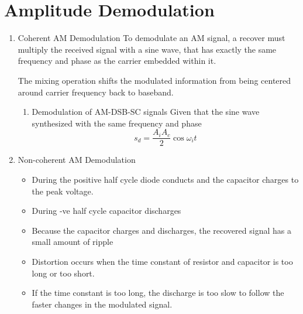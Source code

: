 \documentclass[11pt]{report}
\begin{document}
\section{Amplitude Demodulation}
\label{sec:org9c1f102}
\begin{enumerate}
\item Coherent AM Demodulation
\label{sec:org18ba5b4}
To demodulate an AM signal, a recover must multiply the received signal with a sine wave, that has exactly the same frequency and phase as the carrier embedded within it.

The mixing operation shifts the modulated information from being centered around carrier frequency back to baseband.
\begin{enumerate}
\item Demodulation of AM-DSB-SC signals
\label{sec:org0facd58}
Given that the sine wave synthesized with the same frequency and phase
$$s_d = \frac{A_iA_c}{2}\cos{\omega_i t}$$
\end{enumerate}
\item Non-coherent AM Demodulation
\label{sec:org5e34a7b}
\begin{itemize}
\item During the positive half cycle diode conducts and the capacitor charges to the peak voltage.
\item During -ve half cycle capacitor discharges
\item Because the capacitor charges and discharges, the recovered signal has a small amount of ripple
\item Distortion occurs when the time constant of resistor and capacitor is too long or too short.
\item If the time constant is too long, the discharge is too slow to follow the faster changes in the modulated signal.
\end{itemize}
\end{enumerate}
\end{document}
